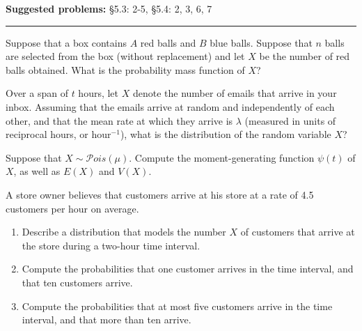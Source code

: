 \documentclass[12pt,reqno]{amsart}
\begin{document}
\textbf{Suggested problems:} \S5.3: 2-5, \S5.4: 2, 3, 6, 7

\bigskip
\hrule

\bigskip
\prob Suppose that a box contains $A$ red balls and $B$ blue balls. Suppose that $n$ balls are selected from the box (without replacement) and let $X$ be the number of red balls obtained. What is the probability mass function of $X$?

\vfill
\prob Over a span of $t$ hours, let $X$ denote the number of emails that arrive in your inbox. Assuming that the emails arrive at random and independently of each other, and that the mean rate at which they arrive is $\lambda$ (measured in units of reciprocal hours, or hour$^{-1}$), what is the distribution of the random variable $X$?

\vfill
\newpage
\prob Suppose that $X\sim \mathcal{P}ois(\mu)$. Compute the moment-generating function $\psi(t)$ of $X$, as well as $E(X)$ and $V(X)$.

\vfill
\prob A store owner believes that customers arrive at his store at a rate of 4.5 customers per hour on average.

\medskip
\begin{enumerate}
\item Describe a distribution that models the number $X$ of customers that arrive at the store during a two-hour time interval.\vfill
\item Compute the probabilities that one customer arrives in the time interval, and that ten customers arrive.\vfill
\item Compute the probabilities that at most five customers arrive in the time interval, and that more than ten arrive.\vfill
\end{enumerate}
\end{document}
